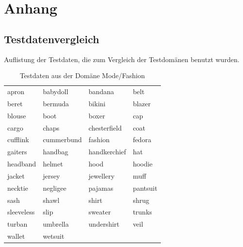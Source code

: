 \documentclass[12pt,a4paper]{report}
\begin{document}
\newpage


\nocite{DBLP:conf/naacl/MikolovYZ13}

\listoftables
\listoffigures 




\chapter{Anhang}
\section{Testdatenvergleich}
\label{Testdatenvergleich}
Auflistung der Testdaten, die zum Vergleich der Testdomänen benutzt wurden.\\


\begin{table}[H]
\caption{Testdaten aus der Domäne Mode/Fashion}
\begin{center}

\begin{tabular}{l|l|l|l}
apron & babydoll & bandana & belt\\
beret & bermuda & bikini & blazer\\
blouse & boot & boxer & cap\\
cargo & chaps & chesterfield & coat\\
cufflink & cummerbund & fashion & fedora\\
gaiters & handbag & handkerchief & hat\\
headband & helmet & hood & hoodie\\
jacket & jersey & jewellery & muff\\
necktie & negligee & pajamas & pantsuit\\
sash & shawl & shirt & shrug\\
sleeveless & slip & sweater & trunks\\
turban & umbrella & undershirt & veil\\
wallet & wetsuit &  & \\
\end{tabular}\\

\end{center}
\end{table}
\end{document}
